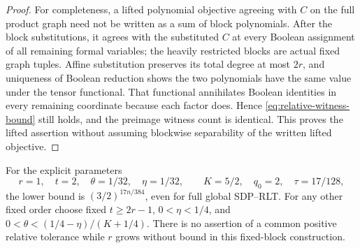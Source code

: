 \begin{proof}
For completeness, a lifted polynomial objective agreeing with $C$ on
the full product graph need not be written as a sum of block polynomials.
After the block substitutions, it agrees with the substituted $C$ at
every Boolean assignment of all remaining formal variables; the heavily
restricted blocks are actual fixed graph tuples. Affine substitution
preserves its total degree at most $2r$, and uniqueness of Boolean
reduction shows the two polynomials have the same value under the tensor
functional. That functional annihilates Boolean identities in every
remaining coordinate because each factor does. Hence
\eqref{eq:relative-witness-bound} still holds, and the preimage witness
count is identical. This proves the lifted assertion without assuming
blockwise separability of the written lifted objective.
\end{proof}

For the explicit parameters
\begin{equation}\label{eq:relative-example}
 r=1,\quad t=2,\quad\theta=1/32,\quad\eta=1/32,
 \qquad K=5/2,\quad q_0=2,\quad\tau=17/128,
\end{equation}
the lower bound is $(3/2)^{17n/384}$, even for full global SDP--RLT.
For any other fixed order choose fixed $t\ge2r-1$, $0<\eta<1/4$,
and $0<\theta<(1/4-\eta)/(K+1/4)$.
There is no assertion of a common positive relative tolerance while
$r$ grows without bound in this fixed-block construction.

